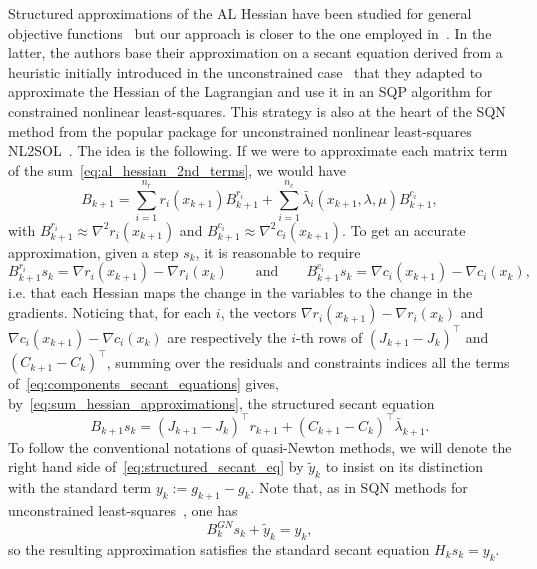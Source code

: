 \documentclass{article}
\numberwithin{equation}{section}
\theoremstyle{plain}
\begin{document}
	Structured approximations of the AL Hessian have been studied for general objective functions~\cite{tapia:1988} but our approach is closer to the one employed in~\cite{li-etal:2002}. In the latter, the authors base their approximation on a secant equation derived from a heuristic initially introduced in the unconstrained case~\cite{biggs:1977} that they adapted to approximate the Hessian of the Lagrangian and use it in an SQP algorithm for constrained nonlinear least-squares. This strategy is also at the heart of the SQN method from the popular package for unconstrained nonlinear least-squares NL2SOL~\cite{dennisetal:1981,dennis-etal:1989}. The idea is the following. If we were to approximate each matrix term of the sum~\eqref{eq:al_hessian_2nd_terms}, we would have
	\begin{equation}\label{eq:sum_hessian_approximations}
		B_{k+1} = \sum_{i=1}^{n_r}  r_i(x_{k+1}) B^{r_i}_{k+1} + \sum_{i=1}^{n_c} \bar{\lambda}_i(x_{k+1},\lambda,\mu) B^{c_i}_{k+1},
	\end{equation}
	with $B^{r_i}_{k+1} \approx \nabla^2r_i(x_{k+1})$ and $B^{c_i}_{k+1} \approx  \nabla^2 c_i(x_{k+1})$. To get an accurate approximation, given a step $s_k$, it is reasonable to require
	\begin{equation}\label{eq:components_secant_equations}
		B^{r_i}_{k+1}s_k = \nabla r_i(x_{k+1}) - \nabla r_i(x_k) \qquad \text{and} \qquad B^{c_i}_{k+1}s_k = \nabla c_i(x_{k+1}) - \nabla c_i(x_k),
	\end{equation}
	i.e. that each Hessian maps the change in the variables to the change in the gradients. Noticing that, for each $i$, the vectors $\nabla r_i(x_{k+1}) - \nabla r_i(x_k)$ and $\nabla c_i(x_{k+1}) - \nabla c_i(x_k)$ are respectively the $i$-th rows of $\left(J_{k+1}-J_k\right)^\top$ and $\left(C_{k+1}-C_k\right)^\top$, summing over the residuals and constraints indices all the terms of~\eqref{eq:components_secant_equations} gives, by~\eqref{eq:sum_hessian_approximations}, the structured secant equation
	\begin{equation}\label{eq:structured_secant_eq}
		B_{k+1}s_k = \left(J_{k+1}-J_k\right)^\top r_{k+1} + \left(C_{k+1}-C_k\right)^\top\bar{\lambda}_{k+1}.
	\end{equation}
	To follow the conventional notations of quasi-Newton methods, we will denote the right hand side of~\eqref{eq:structured_secant_eq} by $\tilde{y}_k$ to insist on its distinction with the standard term $y_k:= g_{k+1}-g_k$. Note that, as in SQN methods for unconstrained least-squares~\cite{lucksan-etal:2019}, one has
	\[B^{GN}_ks_k + \tilde{y}_k = y_k,\]
	so the resulting approximation satisfies the standard secant equation $H_ks_k = y_k$.
	
\end{document}
